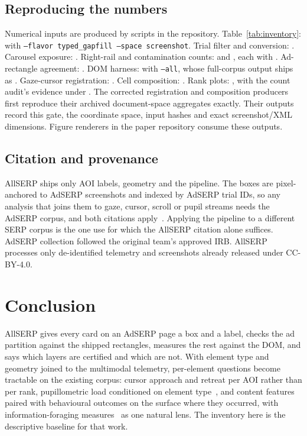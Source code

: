 \documentclass[sigconf,authorversion,natbib=true]{acmart}
\begin{document}
\subsection{Reproducing the numbers}

Numerical inputs are produced by scripts in the  repository. Table~\ref{tab:inventory}:  with \texttt{--flavor typed\_gapfill --space screenshot}. Trial filter and conversion: . Carousel exposure: . Right-rail and contamination counts:  and , each with . Ad-rectangle agreement: . DOM harness:  with \texttt{--all}, whose full-corpus output ships as . Gaze-cursor registration: . Cell composition: . Rank plots: , with the count audit's evidence under . The corrected registration and composition producers first reproduce their archived document-space aggregates exactly. Their outputs record this gate, the coordinate space, input hashes and exact screenshot/XML dimensions. Figure renderers in the paper repository consume these outputs.

\subsection{Citation and provenance}

AllSERP ships only AOI labels, geometry and the pipeline. The boxes are pixel-anchored to AdSERP screenshots and indexed by AdSERP trial IDs, so any analysis that joins them to gaze, cursor, scroll or pupil streams needs the AdSERP corpus, and both citations apply~\cite{latifzadeh2025adserp}. Applying the pipeline to a different SERP corpus is the one use for which the AllSERP citation alone suffices. AdSERP collection followed the original team's approved IRB. AllSERP processes only de-identified telemetry and screenshots already released under CC-BY-4.0.

\section{Conclusion}\label{sec:conclusion}

AllSERP gives every card on an AdSERP page a box and a label, checks the ad partition against the shipped rectangles, measures the rest against the DOM, and says which layers are certified and which are not. With element type and geometry joined to the multimodal telemetry, per-element questions become tractable on the existing corpus: cursor approach and retreat per AOI rather than per rank, pupillometric load conditioned on element type~\cite{duchowski2026rtlfhf,jayawardena2025ripa2}, and content features paired with behavioural outcomes on the surface where they occurred, with information-foraging measures~\cite{pirolli1999foraging,fu2007snifact} as one natural lens. The inventory here is the descriptive baseline for that work.
\end{document}
